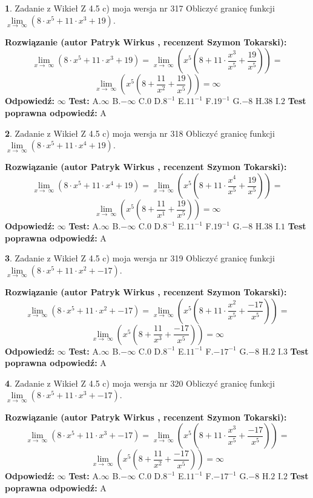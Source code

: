 \documentclass[12pt, a4paper]{article}
\theoremstyle{definition} %
\newtheorem{zad}{}
\newcommand{\zadStart}[1]{\begin{zad}#1\newline}
\newcommand{\zadStop}{\end{zad}}
\newcommand{\rozwStart}[2]{\noindent \textbf{Rozwiązanie (autor #1 , recenzent #2): }\newline}
\newcommand{\rozwStop}{\newline}
\newcommand{\odpStart}{\noindent \textbf{Odpowiedź:}\newline}
\newcommand{\odpStop}{\newline}
\newcommand{\testStart}{\noindent \textbf{Test:}\newline}
\newcommand{\testStop}{\newline}
\newcommand{\kluczStart}{\noindent \textbf{Test poprawna odpowiedź:}\newline}
\newcommand{\kluczStop}{\newline}
\begin{document}
\zadStart{Zadanie z Wikieł Z 4.5 c) moja wersja nr 317}
Obliczyć granicę funkcji  $\lim\limits_{x\to\ \infty}(8 \cdot x^{5}+11 \cdot x^{3}+19)$.
\zadStop
\rozwStart{Patryk Wirkus}{Szymon Tokarski}
$$\lim\limits_{x\to\ \infty}(8 \cdot x^{5}+11 \cdot x^{3}+19) = \lim\limits_{x\to\ \infty}(x^{5}(8 +11 \cdot \frac{x^{3}}{x^{5}}+\frac{19}{x^{5}})) =$$ $$\lim\limits_{x\to\ \infty}(x^{5}(8 +\frac{11}{x^{2}}+\frac{19}{x^{5}})) =\infty$$
\rozwStop
\odpStart
$\infty$
\odpStop
\testStart
A.$\infty$ B.$-\infty$ C.$0$ D.$8^{-1}$ E.$11^{-1}$
F.$19^{-1}$ G.$-8$
H.$38$
I.$2$
\testStop
\kluczStart
A
\kluczStop



\zadStart{Zadanie z Wikieł Z 4.5 c) moja wersja nr 318}
Obliczyć granicę funkcji  $\lim\limits_{x\to\ \infty}(8 \cdot x^{5}+11 \cdot x^{4}+19)$.
\zadStop
\rozwStart{Patryk Wirkus}{Szymon Tokarski}
$$\lim\limits_{x\to\ \infty}(8 \cdot x^{5}+11 \cdot x^{4}+19) = \lim\limits_{x\to\ \infty}(x^{5}(8 +11 \cdot \frac{x^{4}}{x^{5}}+\frac{19}{x^{5}})) =$$ $$\lim\limits_{x\to\ \infty}(x^{5}(8 +\frac{11}{x^{1}}+\frac{19}{x^{5}})) =\infty$$
\rozwStop
\odpStart
$\infty$
\odpStop
\testStart
A.$\infty$ B.$-\infty$ C.$0$ D.$8^{-1}$ E.$11^{-1}$
F.$19^{-1}$ G.$-8$
H.$38$
I.$1$
\testStop
\kluczStart
A
\kluczStop



\zadStart{Zadanie z Wikieł Z 4.5 c) moja wersja nr 319}
Obliczyć granicę funkcji  $\lim\limits_{x\to\ \infty}(8 \cdot x^{5}+11 \cdot x^{2}+-17)$.
\zadStop
\rozwStart{Patryk Wirkus}{Szymon Tokarski}
$$\lim\limits_{x\to\ \infty}(8 \cdot x^{5}+11 \cdot x^{2}+-17) = \lim\limits_{x\to\ \infty}(x^{5}(8 +11 \cdot \frac{x^{2}}{x^{5}}+\frac{-17}{x^{5}})) =$$ $$\lim\limits_{x\to\ \infty}(x^{5}(8 +\frac{11}{x^{3}}+\frac{-17}{x^{5}})) =\infty$$
\rozwStop
\odpStart
$\infty$
\odpStop
\testStart
A.$\infty$ B.$-\infty$ C.$0$ D.$8^{-1}$ E.$11^{-1}$
F.$-17^{-1}$ G.$-8$
H.$2$
I.$3$
\testStop
\kluczStart
A
\kluczStop



\zadStart{Zadanie z Wikieł Z 4.5 c) moja wersja nr 320}
Obliczyć granicę funkcji  $\lim\limits_{x\to\ \infty}(8 \cdot x^{5}+11 \cdot x^{3}+-17)$.
\zadStop
\rozwStart{Patryk Wirkus}{Szymon Tokarski}
$$\lim\limits_{x\to\ \infty}(8 \cdot x^{5}+11 \cdot x^{3}+-17) = \lim\limits_{x\to\ \infty}(x^{5}(8 +11 \cdot \frac{x^{3}}{x^{5}}+\frac{-17}{x^{5}})) =$$ $$\lim\limits_{x\to\ \infty}(x^{5}(8 +\frac{11}{x^{2}}+\frac{-17}{x^{5}})) =\infty$$
\rozwStop
\odpStart
$\infty$
\odpStop
\testStart
A.$\infty$ B.$-\infty$ C.$0$ D.$8^{-1}$ E.$11^{-1}$
F.$-17^{-1}$ G.$-8$
H.$2$
I.$2$
\testStop
\kluczStart
A
\kluczStop
\end{document}
